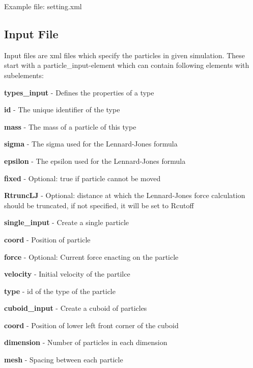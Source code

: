 Example file\+: setting.\+xml\hypertarget{index_ifile_ssec}{}\subsection{Input File}\label{index_ifile_ssec}
Input files are xml files which specify the particles in given simulation. These start with a particle\+\_\+input-\/element which can contain following elements with subelements\+:
\begin{DoxyItemize}
\item {\bfseries types\+\_\+input} -\/ Defines the properties of a type
\begin{DoxyItemize}
\item {\bfseries id} -\/ The unique identifier of the type
\item {\bfseries mass} -\/ The mass of a particle of this type
\item {\bfseries sigma} -\/ The sigma used for the Lennard-\/\+Jones formula
\item {\bfseries epsilon} -\/ The epsilon used for the Lennard-\/\+Jones formula
\item {\bfseries fixed} -\/ Optional\+: true if particle cannot be moved
\item {\bfseries Rtrunc\+LJ} -\/ Optional\+: distance at which the Lennard-\/\+Jones force calculation should be truncated, if not specified, it will be set to Rcutoff
\end{DoxyItemize}
\item {\bfseries single\+\_\+input} -\/ Create a single particle
\begin{DoxyItemize}
\item {\bfseries coord} -\/ Position of particle
\item {\bfseries force} -\/ Optional\+: Current force enacting on the particle
\item {\bfseries velocity} -\/ Initial velocity of the partilce
\item {\bfseries type} -\/ id of the type of the particle
\end{DoxyItemize}
\item {\bfseries cuboid\+\_\+input} -\/ Create a cuboid of particles
\begin{DoxyItemize}
\item {\bfseries coord} -\/ Position of lower left front corner of the cuboid
\item {\bfseries dimension} -\/ Number of particles in each dimension
\item {\bfseries mesh} -\/ Spacing between each particle

\end{DoxyItemize}
\end{DoxyItemize}
